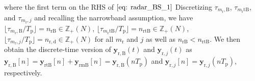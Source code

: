 \documentclass[10pt,journal]{IEEEtran}
\newcommand{\paren}[1]{\left({#1}\right)}
\newcommand{\bracket}[1]{{\left [{#1}\right ]}}
\newcommand{\rr}{_\mathrm{r}}
\newcommand{\target}{\mathrm{t}}
\newcommand{\sfrac}[2]{#1/#2}
\theoremstyle{definition}
\begin{document}
	where the first term on the RHS of $\ref{eq: radar_BS_1}$ Discretizing $\tau_{m\rr,\mathrm{B}}$, $\tau_{m\rr\target\mathrm{B}}$, and $\tau_{m\rr,j}$ and recalling the narrowband assumption, we have $\lfloor\sfrac{\tau_{m\rr,\mathrm{B}}}{T_\mathrm{p}}\rfloor=n_{\mathrm{rB}}\in\mathbb{Z}_{+}\paren{N}$, $\lfloor\sfrac{\tau_{m\rr\target\mathrm{B}}}{T_\mathrm{p}}\rfloor=n_{\mathrm{rtB}}\in\mathbb{Z}_{+}\paren{N}$, $\lfloor\sfrac{\tau_{m\rr,j}}{T_\mathrm{p}}\rfloor=n_{\mathrm{r,d}}\in\mathbb{Z}_{+}\paren{N}$ for all $m\rr$ and $j$ as well as $n_{\mathrm{rB}}<n_{\mathrm{rtB}}$. We then obtain the discrete-time version of $\mathbf{y}_{\mathrm{r,B}}\paren{t}$ and $\mathbf{y}_{\mathrm{r},j}\paren{t}$ as $\mathbf{y}_{\mathrm{r,B}}\bracket{n}=\mathbf{y}_{\mathrm{rtB}}\bracket{n}+\mathbf{y}_{\mathrm{rmB}}\bracket{n}=\mathbf{y}_{\mathrm{r,B}}\paren{nT_{\mathrm{p}}}$ and $\mathbf{y}_{\mathrm{r},j}\bracket{n}=\mathbf{y}_{\mathrm{r},j}\paren{nT_{\mathrm{p}}}$, respectively.
	
\end{document}
